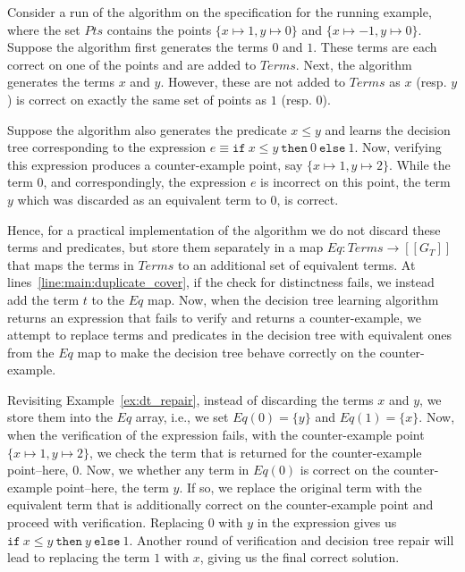\documentclass{llncs}
\newcommand\Equiv{\mathit{Eq}}
\newcommand\Points{\mathit{Pts}}
\newcommand\Expr{e}
\newcommand\Terms{\mathit{Terms}}
\newcommand\Term{t}
\newcommand\Grammar{G}
\newcommand\sem[1]{[\![ #1 ]\!]}
\begin{document}
\begin{example}
  \label{ex:dt_repair}
  Consider a run of the algorithm on the specification for the running
  example, where the set $\Points$ contains the points $\{ x \mapsto 1,
  y \mapsto 0 \}$ and $\{ x \mapsto -1, y \mapsto 0 \}$.
  Suppose the algorithm first generates the terms $0$ and $1$.
  These terms are each correct on one of the points and are added to
  $\Terms$.
  Next, the algorithm generates the terms $x$ and $y$.
  However, these are not added to $\Terms$ as $x$ (resp. $y$) is correct
  on exactly the same set of points as $1$ (resp. $0$).

  Suppose the algorithm also generates the predicate $x \leq y$ and
  learns the decision tree corresponding to the expression $\Expr \equiv
  \mathtt{if}~x \leq y~\mathtt{then}~0~\mathtt{else}~1$.
  Now, verifying this expression produces a counter-example point, say
  $\{ x \mapsto 1, y \mapsto 2 \}$.
  While the term $0$, and correspondingly, the expression $\Expr$ is
  incorrect on this point, the term $y$ which was discarded as an
  equivalent term to $0$, is correct.
\end{example}

Hence, for a practical implementation of the algorithm we do not discard
these terms and predicates, but store them separately in a map $\Equiv :
\Terms \to \sem{\Grammar_T}$ that maps the terms in
$\Terms$ to an additional set of equivalent terms.
At lines~\ref{line:main:duplicate_cover}, if the check for distinctness
fails, we instead add the term $\Term$ to the $\Equiv$ map.
Now, when the decision tree learning algorithm returns an expression
that fails to verify and returns a counter-example, we attempt to
replace terms and predicates in the decision tree with equivalent ones
from the $\Equiv$ map to make the decision tree behave correctly on the
counter-example.

\begin{example}
  Revisiting Example~\ref{ex:dt_repair}, instead of discarding the terms
  $x$ and $y$, we store them into the $\Equiv$ array, i.e., we set
  $\Equiv(0) = \{ y \}$ and $\Equiv(1) = \{ x \}$.
  Now, when the verification of the expression fails, with the
  counter-example point $\{ x \mapsto 1, y \mapsto 2 \}$, we check the
  term that is returned for the counter-example point--here, $0$.
  Now, we whether any term in $\Equiv(0)$ is correct on the
  counter-example point--here, the term $y$.
  If so, we replace the original term with the equivalent term that is
  additionally correct on the counter-example point and proceed with
  verification.
  Replacing $0$ with $y$ in the expression gives us $\mathtt{if}~x \leq
  y~\mathtt{then}~y~\mathtt{else}~1$.
  Another round of verification and decision tree repair will lead to
  replacing the term $1$ with $x$, giving us the final correct solution.
\end{example}
\end{document}
